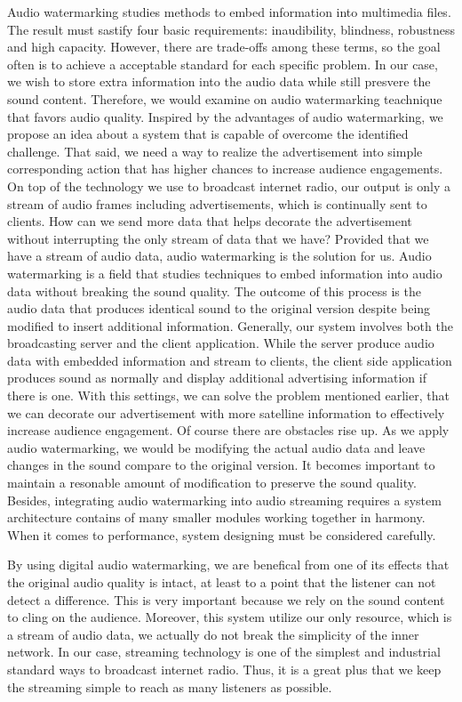 \documentclass[conference]{IEEEtran}
\begin{document}
Audio watermarking studies methods to embed information into multimedia files. The result must sastify four basic requirements: inaudibility, blindness, robustness and high capacity. However, there are trade-offs among these terms, so the goal often is to achieve a acceptable standard for each specific problem. In our case, we wish to store extra information into the audio data while still presvere the sound content. Therefore, we would examine on audio watermarking teachnique that favors audio quality. Inspired by the advantages of audio watermarking, we propose an idea about a system that is capable of overcome the identified challenge. That said, we need a way to realize the advertisement into simple corresponding action that has higher chances to increase audience engagements. On top of the technology we use to broadcast internet radio, our output is only a stream of audio frames including advertisements, which is continually sent to clients. How can we send more data that helps decorate the advertisement without interrupting the only stream of data that we have? Provided that we have a stream of audio data, audio watermarking is the solution for us. Audio watermarking is a field that studies techniques to embed information into audio data without breaking the sound quality. The outcome of this process is the audio data that produces identical sound to the original version despite being modified to insert additional information. Generally, our system involves both the broadcasting server and the client application. While the server produce audio data with embedded information and stream to clients, the client side application produces sound as normally and display additional advertising information if there is one. With this settings, we can solve the problem mentioned earlier, that we can decorate our advertisement with more satelline information to effectively increase audience engagement. Of course there are obstacles rise up. As we apply audio watermarking, we would be modifying the actual audio data and leave changes in the sound compare to the original version. It becomes important to maintain a resonable amount of modification to preserve the sound quality. Besides, integrating audio watermarking into audio streaming requires a system architecture contains of many smaller modules working together in harmony. When it comes to performance, system designing must be considered carefully.

By using digital audio watermarking, we are benefical from one of its effects that the original audio quality is intact, at least to a point that the listener can not detect a difference. This is very important because we rely on the sound content to cling on the audience. Moreover, this system utilize our only resource, which is a stream of audio data, we actually do not break the simplicity of the inner network. In our case, streaming technology is one of the simplest and industrial standard ways to broadcast internet radio. Thus, it is a great plus that we keep the streaming simple to reach as many listeners as possible.
\end{document}
